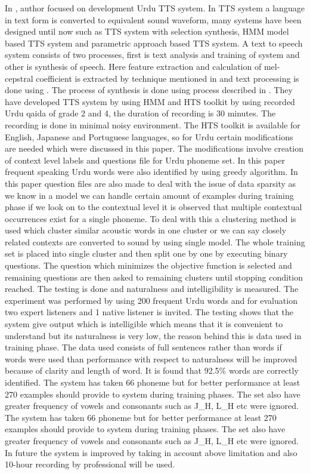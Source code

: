 In \cite{nawaz2014hidden}, author focused on development Urdu TTS system. In TTS system a language in text form is
converted to equivalent sound waveform, many systems have been designed until now such as TTS system with selection
synthesis, HMM model based TTS system and parametric approach based TTS system. A text to speech system consists of
two processes, first is text analysis and training of system and other is synthesis of speech. Here feature extraction and
calculation of mel-cepstral coefficient is extracted by technique mentioned in \cite{fukada1992adaptive} and text processing is done using \cite{kabir2002natural}. The process of synthesis is done using process described in \cite{tokuda2000speech}. They have developed TTS system by
using HMM and HTS toolkit by using recorded Urdu qaida of grade 2 and 4, the duration of recording is 30 minutes. The
recording is done in minimal noisy environment. The HTS toolkit is available for English, Japanese and Portuguese
languages, so for Urdu certain modifications are needed which were discussed in this paper. The modifications involve
creation of context level labels and questions file for Urdu phoneme set. In this paper frequent speaking Urdu words were
also identified by using greedy algorithm. In this paper question files are also made to deal with the issue of data sparsity as
we know in a model we can handle certain amount of examples during training phase if we look on to the contextual level it
is observed that multiple contextual occurrences exist for a single phoneme. To deal with this a clustering method is used
which cluster similar acoustic words in one cluster or we can say closely related contexts are converted to sound by using
single model. The whole training set is placed into single cluster and then split one by one by executing binary questions. The
question which minimizes the objective function is selected and remaining questions are then asked to remaining clusters
until stopping condition reached. The testing is done and naturalness and intelligibility is measured. The experiment was
performed by using 200 frequent Urdu words and for evaluation two expert listeners and 1 native listener is invited. The
testing shows that the system give output which is intelligible which means that it is convenient to understand but its
naturalness is very low, the reason behind this is data used in training phase. The data used consists of full sentences rather
than words if words were used than performance with respect to naturalness will be improved because of clarity and length of
word. It is found that 92.5\% words are correctly identified. The system has taken 66 phoneme but for better performance at
least 270 examples should provide to system during training phases. The set also have greater frequency of vowels and
consonants such as J\_H, L\_H etc were ignored. The system has taken 66 phoneme but for better performance at least 270
examples should provide to system during training phases. The set also have greater frequency of vowels and consonants
such as J\_H, L\_H etc were ignored. In future the system is improved by taking in account above limitation and also 10-hour
recording by professional will be used.


